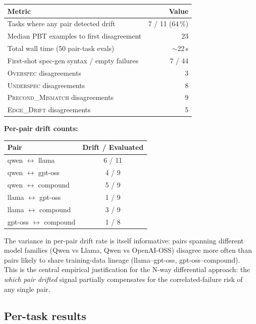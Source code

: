 \documentclass[11pt,a4paper]{article}
\begin{document}
\begin{center}
\small
\begin{tabular}{lr}
\toprule
Metric & Value \\\midrule
Tasks where any pair detected drift & 7 / 11 (64\,\%) \\
Median PBT examples to first disagreement & 23 \\
Total wall time (50 pair-task evals) & $\sim$22\,s \\
First-shot spec-gen syntax / empty failures & 7 / 44 \\
\midrule
\textsc{Overspec} disagreements & 3 \\
\textsc{Underspec} disagreements & 8 \\
\textsc{Precond\_Mismatch} disagreements & 9 \\
\textsc{Edge\_Drift} disagreements & 5 \\
\bottomrule
\end{tabular}

\medskip
\noindent\textbf{Per-pair drift counts:}

\begin{center}
\small
\begin{tabular}{lc}
\toprule
Pair & Drift / Evaluated \\\midrule
qwen $\leftrightarrow$ llama       & 6 / 11 \\
qwen $\leftrightarrow$ gpt-oss     & 4 / 9 \\
qwen $\leftrightarrow$ compound    & 5 / 9 \\
llama $\leftrightarrow$ gpt-oss    & 1 / 9 \\
llama $\leftrightarrow$ compound   & 3 / 9 \\
gpt-oss $\leftrightarrow$ compound & 1 / 8 \\
\bottomrule
\end{tabular}
\end{center}

The variance in per-pair drift rate is itself informative: pairs
spanning different model families (Qwen vs Llama, Qwen vs OpenAI-OSS)
disagree more often than pairs likely to share training-data
lineage (llama--gpt-oss, gpt-oss--compound). This is the central
empirical justification for the N-way differential approach: the
\emph{which pair drifted} signal partially compensates for the
correlated-failure risk of any single pair.
\end{center}

\subsection{Per-task results}
\end{document}
